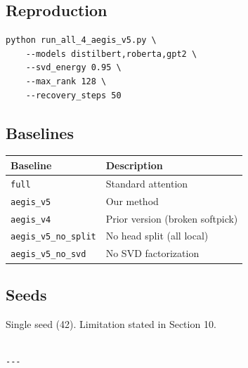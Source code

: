 \subsection{Reproduction}

\begin{lstlisting}
python run_all_4_aegis_v5.py \
    --models distilbert,roberta,gpt2 \
    --svd_energy 0.95 \
    --max_rank 128 \
    --recovery_steps 50
\end{lstlisting}

\subsection{Baselines}

\begin{table}[H]
\centering
\small
\begin{tabular}{ll}
\toprule
\textbf{Baseline} & \textbf{Description} \\
\midrule
\texttt{full} & Standard attention \\
\texttt{aegis\_v5} & Our method \\
\texttt{aegis\_v4} & Prior version (broken softpick) \\
\texttt{aegis\_v5\_no\_split} & No head split (all local) \\
\texttt{aegis\_v5\_no\_svd} & No SVD factorization \\
\bottomrule
\end{tabular}
\end{table}

\subsection{Seeds}

Single seed (42). Limitation stated in Section 10.
\begin{lstlisting}

---
\end{lstlisting}